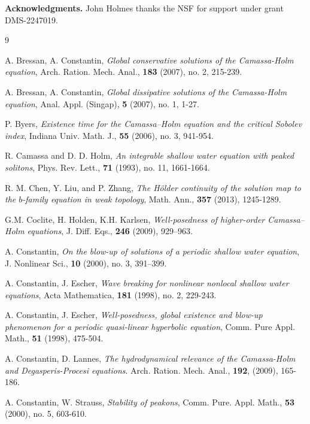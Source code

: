 \documentclass[reqno]{amsart}
\theoremstyle{plain}
\numberwithin{equation}{section}
\begin{document}
{\bf Acknowledgments.}
John Holmes thanks the NSF for support under grant DMS-2247019.



\begin{thebibliography}{9}

A. Bressan, A. Constantin, \textit{Global conservative solutions of the Camassa-Holm equation}, Arch. Ration. Mech. Anal., \textbf{183} (2007), no. 2, 215-239.

A. Bressan, A. Constantin, \textit{Global dissipative solutions of the Camassa-Holm equation}, Anal. Appl. (Singap), \textbf{5} (2007), no. 1, 1-27.

P. Byers, \textit{Existence time for the Camassa–Holm equation and the critical Sobolev index},
Indiana Univ. Math. J., \textbf{55} (2006), no. 3, 941-954.

R. Camassa and D. D. Holm,
\textit{An integrable shallow water equation with peaked solitons}, Phys. Rev. Lett., \textbf{71} (1993), no. 11, 1661-1664.


R. M. Chen, Y. Liu, and P. Zhang,
\textit{The H\"older continuity of the solution map
to the $b$-family equation in weak topology}, Math. Ann., \textbf{357} (2013), 1245-1289.


G.M. Coclite, H. Holden, K.H. Karlsen, \textit{Well-posedness of higher-order Camassa–Holm equations}, J. Diff. Eqs., \textbf{246} (2009), 929–963.

A. Constantin,
\textit{On the blow-up of solutions of a periodic shallow water equation},
J. Nonlinear Sci., \textbf{10} (2000), no. 3, 391–399.

A. Constantin, J. Escher, \textit{Wave breaking for nonlinear nonlocal shallow water equations}, Acta Mathematica, \textbf{181} (1998), no. 2, 229-243.

A. Constantin, J. Escher, \textit{Well-posedness, global existence and blow-up phenomenon for a periodic quasi-linear hyperbolic
equation}, Comm. Pure Appl. Math., \textbf{51} (1998), 475-504.

A. Constantin, D. Lannes, \textit{The hydrodynamical relevance of the Camassa-Holm and Degasperis-Procesi equations}. Arch. Ration. Mech. Anal., \textbf{192}, (2009), 165-186.

A. Constantin, W. Strauss, \textit{Stability of peakons}, Comm. Pure. Appl. Math., \textbf{53} (2000), no. 5, 603-610.


\end{thebibliography}
\end{document}
